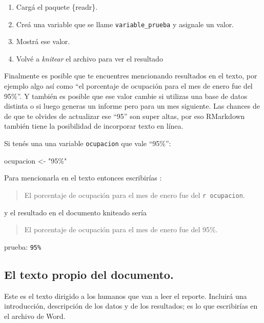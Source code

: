 \documentclass[
  openany]{book}
\newenvironment{Shaded}{\begin{snugshade}}{\end{snugshade}}
\newcommand{\NormalTok}[1]{#1}
\newcommand{\OtherTok}[1]{\textcolor[rgb]{0.56,0.35,0.01}{#1}}
\newcommand{\StringTok}[1]{\textcolor[rgb]{0.31,0.60,0.02}{#1}}
\providecommand{\tightlist}{%
  \setlength{\itemsep}{0pt}\setlength{\parskip}{0pt}}
\begin{document}
\begin{enumerate}
\def\labelenumi{\arabic{enumi}.}
\tightlist
\item
  Cargá el paquete \{readr\}.
\item
  Creá una variable que se llame \texttt{variable\_prueba} y asignale un valor.
\item
  Mostrá ese valor.
\item
  Volvé a \emph{knitear} el archivo para ver el resultado
\end{enumerate}

Finalmente es posible que te encuentres mencionando resultados en el texto, por ejemplo algo así como ``el porcentaje de ocupación para el mes de enero fue del 95\%''.
Y también es posible que ese valor cambie si utilizas una base de datos distinta o si luego generas un informe pero para un mes siguiente.
Las chances de de que te olvides de actualizar ese ``95'' son super altas, por eso RMarkdown también tiene la posibilidad de incorporar texto en línea.

Si tenés una una variable \texttt{ocupacion} que vale ``95\%'':

\begin{Shaded}
\begin{Highlighting}[]
\NormalTok{ocupacion }\OtherTok{\textless{}{-}} \StringTok{"95\%"}
\end{Highlighting}
\end{Shaded}

Para mencionarla en el texto entonces escribirías :

\begin{quote}
El porcentaje de ocupación para el mes de enero fue del \texttt{\textasciigrave{}r\ ocupacion\textasciigrave{}}.
\end{quote}

y el resultado en el documento kniteado sería

\begin{quote}
El porcentaje de ocupación para el mes de enero fue del 95\%.
\end{quote}

prueba: \texttt{95\%}

\hypertarget{el-texto-propio-del-documento.}{%
\subsection{El texto propio del documento.}\label{el-texto-propio-del-documento.}}

Este es el texto dirigido a los humanos que van a leer el reporte.
Incluirá una introducción, descripción de los datos y de los resultados; es lo que escribirías en el archivo de Word.
\end{document}

